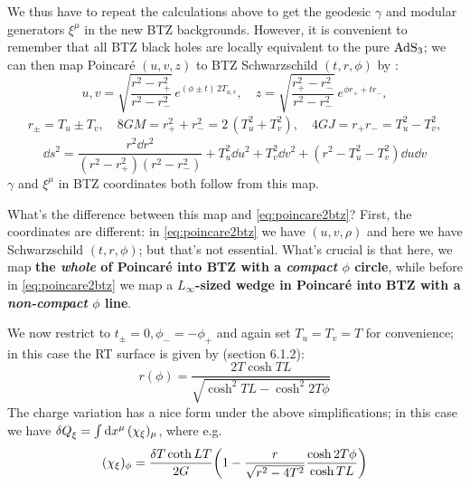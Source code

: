 \documentclass[11pt,a4paper]{article}
\begin{document}
	We thus have to repeat the calculations above to get the geodesic $\gamma$ and modular generators $\xi^\mu$ in the new BTZ backgrounds. However, it is convenient to remember that all BTZ black holes are locally equivalent to the pure $\mathrm{AdS}_3$; we can then map Poincar\'e $(u,v,z)$ to BTZ Schwarzschild $(t,r,\phi)$ by \cite{Hubeny:2007xt}:
	\begin{equation}
		u,v = \sqrt{\frac{r^2 - r_+^2}{r^2 - r_-^2}}\,
			e^{(\phi\pm t)\,2T_{u,v}},
	\quad
		z = \sqrt{\frac{r_+^2 - r_-^2}{r^2 - r_-^2}}\,
			e^{\phi r_+ + t r_-},
	\end{equation}
	\begin{gather}
		r_\pm = T_u \pm T_v,
	\quad
		8GM = r_+^2 + r_-^2
		= 2\,(T_u^2 + T_v^2),
	\quad
		4GJ = r_+ r_-
		= T_u^2 - T_v^2,
	\end{gather}
	\begin{equation}
		\dd{s}^2
		= \frac{r^2 \dd{r}^2}{
				(r^2 - r_+^2)
				(r^2 - r_-^2)
			}
			+ T_u^2 \dd{u}^2
			+ T_v^2 \dd{v}^2
			+ (r^2 - T_u^2 - T_v^2) \dd{u} \dd{v}
	\end{equation}
	$\gamma$ and $\xi^\mu$ in BTZ coordinates both follow from this map. 
	
	What's the difference between this map and \eqref{eq:poincare2btz}? First, the coordinates are different: in \eqref{eq:poincare2btz} we have $(u,v,\rho)$ and here we have Schwarzschild $(t,r,\phi)$; but that's not essential. What's crucial is that here, we map \textbf{the \textsl{whole} of Poincar\'e into BTZ with a \textsl{compact} $\phi$ circle}, while before in \eqref{eq:poincare2btz} we map a \textbf{$L_\infty$-sized wedge in Poincar\'e into BTZ with a \textsl{non-compact} $\phi$ line}. 
	
	We now restrict to $t_\pm = 0, \phi_- = -\phi_+$ and again set $T_u = T_v = T$ for convenience; in this case the RT surface is given by \textcite{Rangamani:2016dms} (section 6.1.2):
	\begin{equation}
		r(\phi) = \frac{2T\cosh TL}{
				\sqrt{\cosh^2 TL - \cosh^2 2T\phi}
			}
	\end{equation}
	The charge variation has a nice form under the above simplifications; in this case we have $
		\var{Q}_{\xi}
		= \int \dd{x^\mu} (\chi_\xi)_\mu
	$, where e.g.
	\begin{equation}
		(\chi_\xi)_\phi
		= \frac{\var{T} \coth LT}{2G}
			\pqty{
				1 - {\frac{r}{\sqrt{r^2 - 4T^2}}}
				\frac{\cosh 2T\phi}{\cosh TL}
			}
	\end{equation}
	
\end{document}

